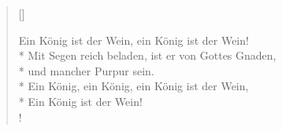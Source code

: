 
\settowidth{\versewidth}{Ein König ist der Wein, ein König ist der Wein!}



\begin{verse}[\versewidth]


Ein König ist der Wein, ein König ist der Wein!\\*
Mit Segen reich beladen, ist er von Gottes Gnaden,\\*
und mancher Purpur sein.\\*
Ein König, ein König, ein König ist der Wein,\\*
Ein König ist der Wein!\\!


\end{verse}

